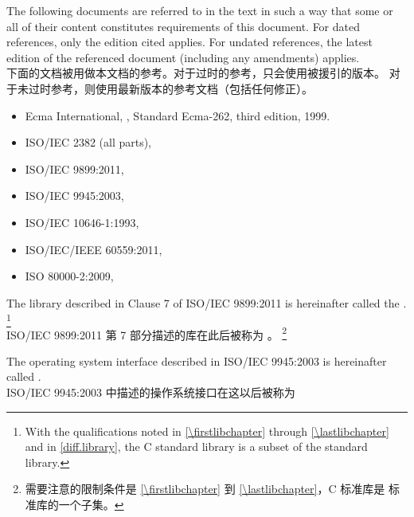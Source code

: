 \pnum
{}%
The following documents are referred to in the text
in such a way that some or all of their content
constitutes requirements
of this document. For dated references, only the edition cited applies.
For undated references, the latest edition of the referenced document
(including any amendments) applies.\\
下面的文档被用做本文档的参考。对于过时的参考，只会使用被援引的版本。
对于未过时参考，则使用最新版本的参考文档（包括任何修正）。
\begin{itemize}
\item Ecma International, ,
Standard Ecma-262, third edition, 1999.
\item ISO/IEC 2382 (all parts), 
\item ISO/IEC 9899:2011, 
\item ISO/IEC 9945:2003, 
\item ISO/IEC 10646-1:1993, 
\item ISO/IEC/IEEE 60559:2011, 
\item ISO 80000-2:2009, 
\end{itemize}

\pnum
The library described in Clause 7 of ISO/IEC 9899:2011
is hereinafter called the
.%
\footnote{With the qualifications noted in \ref{\firstlibchapter}
through \ref{\lastlibchapter} and in \ref{diff.library}, the C standard
library is a subset of the \Cpp{} standard library.} \\
ISO/IEC 9899:2011 第 7 部分描述的库在此后被称为
。%
\footnote{需要注意的限制条件是 \ref{\firstlibchapter} 到 \ref{\lastlibchapter}，C 
标准库是 \Cpp{} 标准库的一个子集。}

\pnum
The operating system interface described in ISO/IEC 9945:2003 is
hereinafter called . \\
ISO/IEC 9945:2003 中描述的操作系统接口在这以后被称为 

